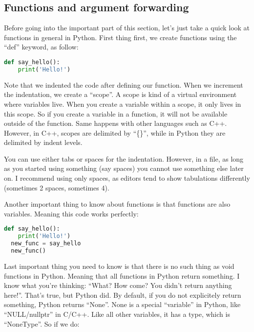 \subsection{Functions and argument forwarding}
Before going into the important part of this section, let's just take a quick look
at functions in general in Python. First thing first, we create functions using
the ``def'' keyword, as follow:

\begin{lstlisting}[language=python]
  def say_hello():
    print('Hello!')
\end{lstlisting}

Note that we indented the code after defining our function. When we increment the
indentation, we create a ``scope''. A scope is kind of a virtual environment where variables live.
When you create a variable within a scope, it only lives in this scope. So if you create
a variable in a function, it will not be available outside of the function. Same happens with
other languages such as C++. However, in C++, scopes are delimited by ``\{\}'', while in Python they
are delimited by indent levels.

\vspace{5mm}

You can use either tabs or spaces for the indentation. However, in a file, as long as you started
using something (say spaces) you cannot use something else later on. I recommend using only spaces,
as editors tend to show tabulations differently (sometimes 2 spaces, sometimes 4).

\vspace{5mm}

Another important thing to know about functions is that functions are also variables. Meaning this
code works perfectly:

\begin{lstlisting}[language=python]
  def say_hello():
    print('Hello!')
  new_func = say_hello
  new_func()
\end{lstlisting}

Last important thing you need to know is that there is no such thing as void functions in Python.
Meaning that all functions in Python return something. I know what you're thinking: ``What? How come?
You didn't return anything here!''. That's true, but Python did. By default, if you do not explicitely
return something, Python returns ``None''. None is a special ``variable'' in Python,
like ``NULL/nullptr'' in C/C++. Like all other variables, it has a type, which is ``NoneType''.
So if we do:

